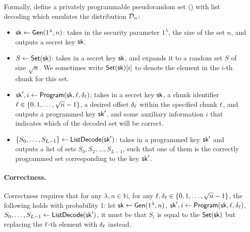 Formally, define a privately programmable pseudorandom set (\ppps) 
with list decoding
which emulates the distribution $\mathcal{D}_n$:

\begin{itemize}[leftmargin=5mm,itemsep=1pt]
\item 
 $\mathsf{sk} \leftarrow {\sf Gen}(1^\lambda, n)$:
takes in the security parameter $1^\lambda$, the size
of the set $n$, and outputs a secret key $\mathsf{sk}$.
\item 
$S \leftarrow {\sf Set}(\mathsf{sk})$:
takes in a secret key $\mathsf{sk}$, and expands it to a random set $S$
of size $\sqrt{n}$.
We sometimes write ${\sf Set}(\mathsf{sk})[i]$ to denote the element in the $i$-th chunk for this set.
\item 
 $\mathsf{sk}', i \leftarrow {\sf Program}(\mathsf{sk}, \ell, \delta_\ell)$:
takes in a secret key $\mathsf{sk}$, a chunk identifier
$\ell \in \{0, 1, \ldots, \sqrt{n}-1\}$, 
a desired offset 
$\delta_\ell$
within the specified chunk 
$\ell$, 
 and 
outputs a programmed
key $\mathsf{sk}'$, and some auxiliary information 
$i$ that 
indicates which of the decoded set 
will be correct. 
\item 
 $\{S_0, \ldots, S_{L-1}\} \leftarrow {\sf ListDecode}(\mathsf{sk}')$:
takes in a programmed key $\mathsf{sk}'$ and 
outputs a list of sets $S_0, S_2, \ldots, S_{L-1}$, such that
one of them is the correctly programmed set corresponding to the key $\mathsf{sk}'$. 
\end{itemize}


\paragraph{Correctness.}
Correctness requires that 
for any $\lambda, n \in \mathbb{N}$, 
for any $\ell, \delta_\ell \in \{0, 1, \ldots, \sqrt{n}-1\}$, 
the following holds with probability 1:
let 
$\mathsf{sk} \leftarrow {\sf Gen}(1^\lambda, n)$, 
$\mathsf{sk}', i \leftarrow {\sf Program}(\mathsf{sk}, \ell, \delta_\ell)$, 
$S_0, \ldots, S_{L-1}
\leftarrow {\sf ListDecode}(\mathsf{sk}')$, 
it must be that 
$S_i$ is equal to the ${\sf Set}(\mathsf{sk})$ 
but replacing 
the $\ell$-th element with 
$\delta_\ell$ instead.

